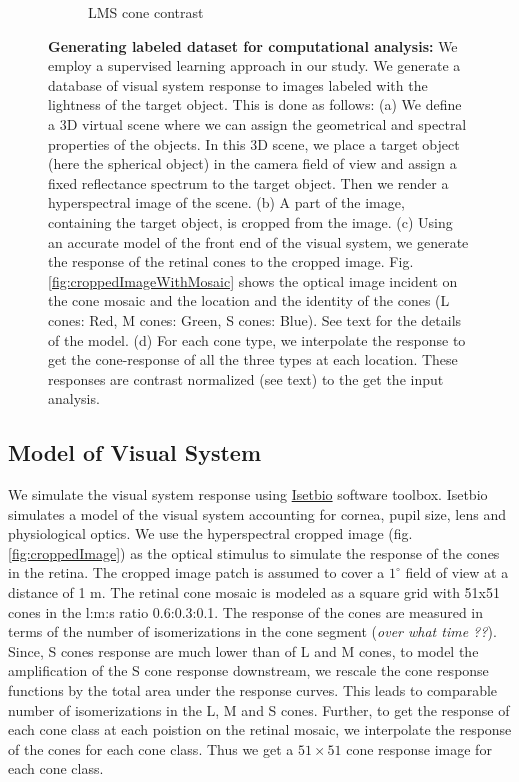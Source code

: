 \documentclass{jov}
\begin{document}
\begin{figure}
\begin{subfigure}[b]{0.2 \textwidth}
        \caption{LMS cone contrast}
        \label{fig:coneContrast}
    \end{subfigure}

    \label{fig:sceneWithCroppedImage}
    \caption{{\bf Generating labeled dataset for computational analysis:}  We employ a supervised learning approach in our study. We generate a database of visual system response to images labeled with the lightness of the target object. This is done as follows: (a) We define a 3D virtual scene where we can assign the geometrical and spectral properties of the objects. In this 3D scene, we place a target object (here the spherical object) in the camera field of view and assign a fixed reflectance spectrum to the target object. Then we render a hyperspectral image of the scene. (b) A part of the image, containing the target object, is cropped from the image. (c) Using an accurate model of the front end of the visual system, we generate the response of the retinal cones to the cropped image. Fig.\ref{fig:croppedImageWithMosaic} shows the optical image incident on the cone mosaic and the location and the identity of the cones (L cones: Red, M cones: Green, S cones: Blue). See text for the details of the model. (d) For each cone type, we interpolate the response to get the cone-response of all the three types at each location. These responses are contrast normalized (see text) to the get the input analysis.}
\end{figure}

\subsection{Model of Visual System} \label{method:Isetbio}
We simulate the visual system response using \href{http://isetbio.org}{Isetbio} software toolbox. Isetbio simulates a model of the visual system accounting for cornea, pupil size, lens and physiological optics. We use the hyperspectral cropped image (fig.\ref{fig:croppedImage}) as the optical stimulus to simulate the response of the cones in the retina. The cropped image patch is assumed to cover a $1^{\circ}$ field of view at a distance of 1 m. The retinal cone mosaic is modeled as a square grid with 51x51 cones in the l:m:s ratio 0.6:0.3:0.1. The response of the cones are measured in terms of the number of isomerizations in the cone segment ({\it over what time ??}). Since, S cones response are much lower than of L and M cones, to model the amplification of the S cone response downstream, we rescale the cone response functions by the total area under the response curves. This leads to comparable number of isomerizations in the L, M and S cones. Further, to get the response of each cone class at each poistion on the retinal mosaic, we interpolate the response of the cones for each cone class. Thus we get a $51 \times 51$ cone response image for each cone class.
\end{document}
